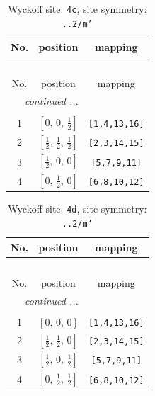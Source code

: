 \documentclass[fleqn,8pt]{jsarticle}
\begin{document}
\renewcommand{\arraystretch}{1.2}
\begin{longtable}{ccc}
\caption{Wyckoff site: {\tt 4c}, site symmetry: {\tt ..2/m'}}
 \\
 \hline \hline
No. & position & mapping \\ \hline \endfirsthead

\multicolumn{2}{l}{\tablename\ \thetable{}} \\
 \hline \hline
No. & position & mapping \\ \hline \endhead

 \hline \hline
\multicolumn{2}{r}{\footnotesize\it continued ...} \\ \endfoot

 \hline \hline
\multicolumn{2}{r}{} \\ \endlastfoot

1 & $\left[ 0,\, 0,\, \frac{1}{2} \right]$ & {\tt [1,4,13,16]} \\ \hline
2 & $\left[ \frac{1}{2},\, \frac{1}{2},\, \frac{1}{2} \right]$ & {\tt [2,3,14,15]} \\ \hline
3 & $\left[ \frac{1}{2},\, 0,\, 0 \right]$ & {\tt [5,7,9,11]} \\ \hline
4 & $\left[ 0,\, \frac{1}{2},\, 0 \right]$ & {\tt [6,8,10,12]} \\
\end{longtable}
\renewcommand{\arraystretch}{1.2}
\begin{longtable}{ccc}
\caption{Wyckoff site: {\tt 4d}, site symmetry: {\tt ..2/m'}}
 \\
 \hline \hline
No. & position & mapping \\ \hline \endfirsthead

\multicolumn{2}{l}{\tablename\ \thetable{}} \\
 \hline \hline
No. & position & mapping \\ \hline \endhead

 \hline \hline
\multicolumn{2}{r}{\footnotesize\it continued ...} \\ \endfoot

 \hline \hline
\multicolumn{2}{r}{} \\ \endlastfoot

1 & $\left[ 0,\, 0,\, 0 \right]$ & {\tt [1,4,13,16]} \\ \hline
2 & $\left[ \frac{1}{2},\, \frac{1}{2},\, 0 \right]$ & {\tt [2,3,14,15]} \\ \hline
3 & $\left[ \frac{1}{2},\, 0,\, \frac{1}{2} \right]$ & {\tt [5,7,9,11]} \\ \hline
4 & $\left[ 0,\, \frac{1}{2},\, \frac{1}{2} \right]$ & {\tt [6,8,10,12]} \\
\end{longtable}
\end{document}
